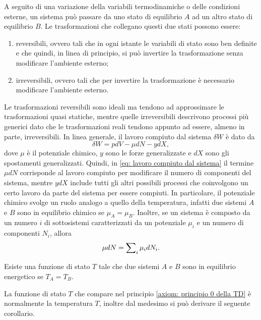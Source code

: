 A seguito di una variazione della variabili termodinamiche o delle condizioni esterne, un sistema può passare da uno stato di equilibrio $A$ ad un altro stato di equilibrio $B$. Le trasformazioni che collegano questi due stati possono essere:
\begin{enumerate}
    \item reversibili, ovvero tali che in ogni istante le variabili di stato sono ben definite e che quindi, in linea di principio, si può invertire la trasformazione senza modificare l'ambiente esterno;
    \item irreversibili, ovvero tali che per invertire la trasformazione è necessario modificare l'ambiente esterno.
\end{enumerate}
Le trasformazioni reversibili sono ideali ma tendono ad approssimare le trasformazioni quasi statiche, mentre quelle irreversibili descrivono processi più generici dato che le trasformazioni reali tendono appunto ad essere, almeno in parte, irreversibili. In linea generale, il lavoro compiuto dal sistema $\delta W$ è dato da 
\begin{equation}
\label{eq: lavoro compiuto dal sistema}
    \delta W = pdV - \mu dN - ydX,
\end{equation}
dove $\mu$ è il potenziale chimico, $y$ sono le forze generalizzate e $dX$ sono gli spostamenti generalizzati. Quindi, in \eqref{eq: lavoro compiuto dal sistema} il termine $\mu dN$ corrisponde al lavoro compiuto per modificare il numero di componenti del sistema, mentre $ydX$ include tutti gli altri possibili processi che coinvolgono un certo lavoro da parte del sistema per essere compiuti. In particolare, il potenziale chimico svolge un ruolo analogo a quello della temperatura, infatti due sistemi $A$ e $B$ sono in equilibrio chimico se $\mu_A=\mu_B$. Inoltre, se un sistema è composto da un numero $i$ di sottosistemi caratterizzati da un potenziale $\mu_i$ e un numero di componenti $N_i$, allora 
\begin{equation}
\label{eq: contributo lavoro chimico sistema composto}
    \mu dN=\sum\nolimits_i\mu_idN_i.
\end{equation}
\begin{axiom}
\label{axiom: principio 0 della TD}
    Esiste una funzione di stato $T$ tale che due sistemi $A$ e $B$ sono in equilibrio energetico se $T_A=T_B$.
\end{axiom}
La funzione di stato $T$ che compare nel principio \ref{axiom: principio 0 della TD} è normalmente la temperatura $T$, inoltre dal medesimo si può derivare il seguente corollario.

